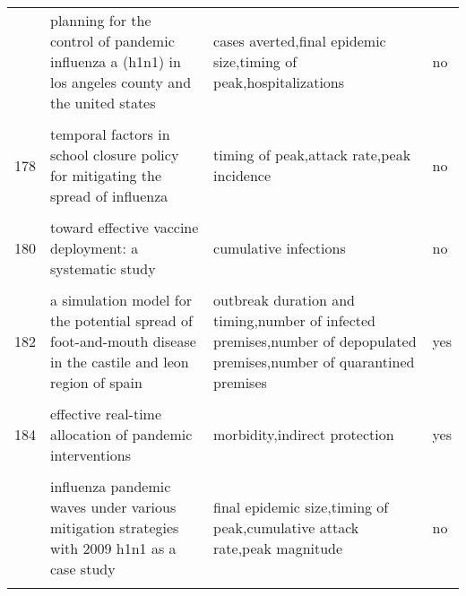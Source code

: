 \documentclass[
]{article}
\begin{document}
\begin{landscape}
\begin{longtable}{l>{\raggedright\arraybackslash}p{4cm}>{\raggedright\arraybackslash}p{6cm}l}
\addlinespace
176 & planning for the control of pandemic influenza a (h1n1) in los angeles county and the united states & cases averted,final epidemic size,timing of peak,hospitalizations & no\\
\cellcolor{gray!6}{177} & \cellcolor{gray!6}{prioritization of delayed vaccination for pandemic influenza} & \cellcolor{gray!6}{deaths averted,attack rate,hospitalizations} & \cellcolor{gray!6}{yes}\\
178 & temporal factors in school closure policy for mitigating the spread of influenza & timing of peak,attack rate,peak incidence & no\\
\cellcolor{gray!6}{179} & \cellcolor{gray!6}{the global transmission and control of influenza} & \cellcolor{gray!6}{attack rate,prevalence} & \cellcolor{gray!6}{yes}\\
180 & toward effective vaccine deployment: a systematic study & cumulative infections & no\\
\addlinespace
\cellcolor{gray!6}{181} & \cellcolor{gray!6}{vaccination against 2009 pandemic h1n1 in a population dynamical model of vancouver, canada: timing is everything} & \cellcolor{gray!6}{campaign duration,attack rate,case fatality} & \cellcolor{gray!6}{yes}\\
182 & a simulation model for the potential spread of foot-and-mouth disease in the castile and leon region of spain & outbreak duration and timing,number of infected premises,number of depopulated premises,number of quarantined premises & yes\\
\cellcolor{gray!6}{183} & \cellcolor{gray!6}{community-based measures for mitigating the 2009 h1n1 pandemic in china} & \cellcolor{gray!6}{timing of peak} & \cellcolor{gray!6}{no}\\
184 & effective real-time allocation of pandemic interventions & morbidity,indirect protection & yes\\
\cellcolor{gray!6}{185} & \cellcolor{gray!6}{efficient mitigation strategies for epidemics in rural regions} & \cellcolor{gray!6}{cases averted} & \cellcolor{gray!6}{yes}\\
\addlinespace
186 & influenza pandemic waves under various mitigation strategies with 2009 h1n1 as a case study & final epidemic size,timing of peak,cumulative attack rate,peak magnitude & no\\
\cellcolor{gray!6}{187} & \cellcolor{gray!6}{is a mass immunization program for pandemic (h1n1) 2009 good value for money? early evidence from the canadian experience} & \cellcolor{gray!6}{cost,hospitalizations,qualys} & \cellcolor{gray!6}{no}\\

\end{longtable}
\end{landscape}
\end{document}
